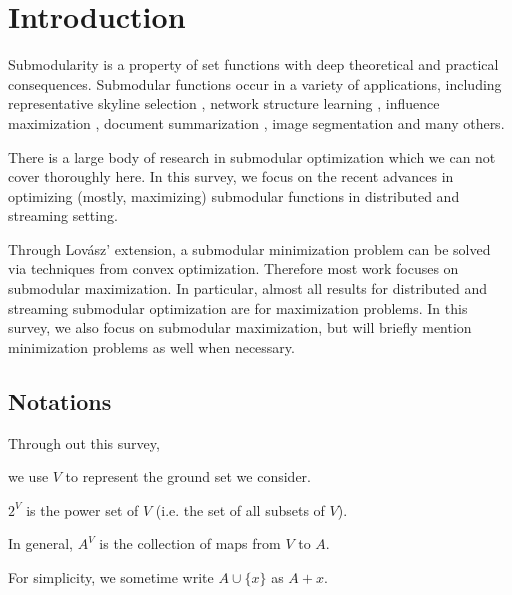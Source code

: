 \section{Introduction}
Submodularity is a property of set functions with deep theoretical and practical consequences. Submodular functions occur in a variety of applications, including representative skyline selection \cite{SLN+11}, network structure learning \cite{GLK10}, influence maximization \cite{KKT03}, document summarization \cite{LB11}, image segmentation \cite{BJM01,KKT09} and many others.


There is a large body of research in submodular optimization which we can not cover thoroughly here. In this survey, we focus on the recent advances in optimizing (mostly, maximizing) submodular functions in distributed and streaming setting.



Through Lov{\'a}sz' extension, a submodular minimization problem can be solved via techniques from convex optimization. Therefore most work focuses on submodular maximization. In particular, almost all results for distributed and streaming submodular optimization are for maximization problems. In this survey, we also focus on submodular maximization, but will briefly mention minimization problems as well when necessary.

\subsection{Notations}
Through out this survey, 

we use $V$ to represent the ground set we consider. 

$2^V$ is the power set of $V$ (i.e. the set of all subsets of $V$).

In general, $A^V$ is the collection of maps from $V$ to $A$. 

For simplicity, we sometime write $A \cup \{x\}$ as $A + x$.
